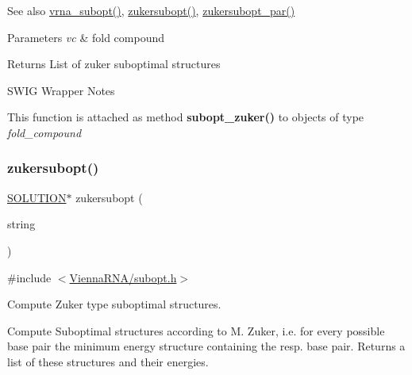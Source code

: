 \begin{DoxySeeAlso}{See also}
\hyperlink{group__subopt__wuchty_ga0f11d738fb8c8b1885a90c11c8931ff6}{vrna\+\_\+subopt()}, \hyperlink{group__subopt__zuker_ga0d5104e3ecf119d8eabd40aa5fe47f90}{zukersubopt()}, \hyperlink{group__subopt__zuker_gab6d0ea8cc1d02f6dd831ca81043c9eb8}{zukersubopt\+\_\+par()}
\end{DoxySeeAlso}

\begin{DoxyParams}{Parameters}
{\em vc} & fold compound \\
\hline
\end{DoxyParams}
\begin{DoxyReturn}{Returns}
List of zuker suboptimal structures
\end{DoxyReturn}
\begin{DoxyRefDesc}{S\+W\+I\+G Wrapper Notes}
\item[\hyperlink{wrappers__wrappers000063}{S\+W\+I\+G Wrapper Notes}]This function is attached as method {\bfseries subopt\+\_\+zuker()} to objects of type {\itshape fold\+\_\+compound} \end{DoxyRefDesc}
\mbox{\label{group__subopt__zuker_ga0d5104e3ecf119d8eabd40aa5fe47f90}} 
\subsubsection{\texorpdfstring{zukersubopt()}{zukersubopt()}}
{\footnotesize\ttfamily \hyperlink{subopt_8h_aa0f46ff02e1017469cf902d02ecd7f9a}{S\+O\+L\+U\+T\+I\+ON}$\ast$ zukersubopt (\begin{DoxyParamCaption}\item[{const char $\ast$}]{string }\end{DoxyParamCaption})}



{\ttfamily \#include $<$\hyperlink{subopt_8h}{Vienna\+R\+N\+A/subopt.\+h}$>$}



Compute Zuker type suboptimal structures. 

Compute Suboptimal structures according to M. Zuker, i.\+e. for every possible base pair the minimum energy structure containing the resp. base pair. Returns a list of these structures and their energies.

